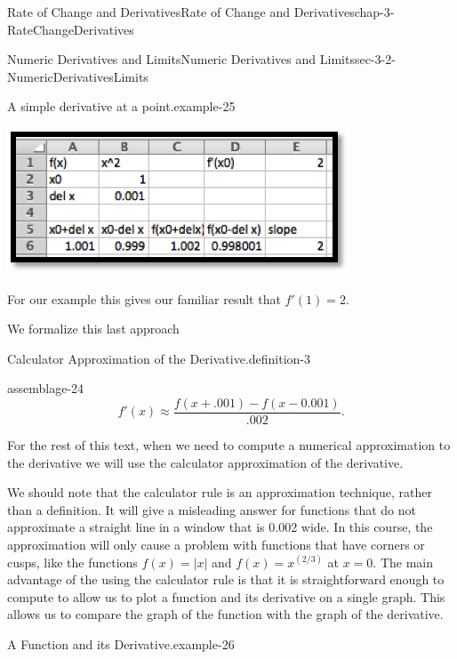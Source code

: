 \documentclass[oneside,10pt,]{book}
\numberwithin{equation}{section}
\begin{document}
\begin{chapterptx}{Rate of Change and Derivatives}{}{Rate of Change and Derivatives}{}{}{chap-3-RateChangeDerivatives}
\begin{sectionptx}{Numeric Derivatives and Limits}{}{Numeric Derivatives and Limits}{}{}{sec-3-2-NumericDerivativesLimits}
\begin{example}{A simple derivative at a point.}{example-25}
\begin{sidebyside}{1}{0.15}{0.15}{0}%
\begin{sbspanel}{0.7}%
\includegraphics[width=1\linewidth]{images/sec3-2-6.png}
\end{sbspanel}%
\end{sidebyside}%
\par
\hypertarget{p-1031}{}%
For our example this gives our familiar result that \(f'(1)=2\).%
\end{example}
\hypertarget{p-1032}{}%
We formalize this last approach%
\begin{definition}{Calculator Approximation of the Derivative.}{definition-3}%
\begin{assemblage}{}{assemblage-24}%
\hypertarget{p-1033}{}%
%
\begin{equation*}
f'(x)\approx\frac{f(x+.001)-f(x-0.001)}{.002}.  
\end{equation*}
%
\end{assemblage}
\end{definition}
\hypertarget{p-1034}{}%
For the rest of this text, when we need to compute a numerical approximation to the derivative we will use the calculator approximation of the derivative.%
\par
\hypertarget{p-1035}{}%
We should note that the calculator rule is an approximation technique, rather than a definition.  It will give a misleading answer for functions that do not approximate a straight line in a window that is 0.002 wide.  In this course, the approximation will only cause a problem with functions that have corners or cusps, like the functions \(f(x)=|x|\) and \(f(x)=x^{(2/3)}\) at \(x=0\).  The main advantage of the using the calculator rule is that it is straightforward enough to compute to allow us to plot a function and its derivative on a single graph.  This allows us to compare the graph of the function with the graph of the derivative.%
\begin{example}{A Function and its Derivative.}{example-26}%

\end{example}
\end{sectionptx}
\end{chapterptx}
\end{document}
